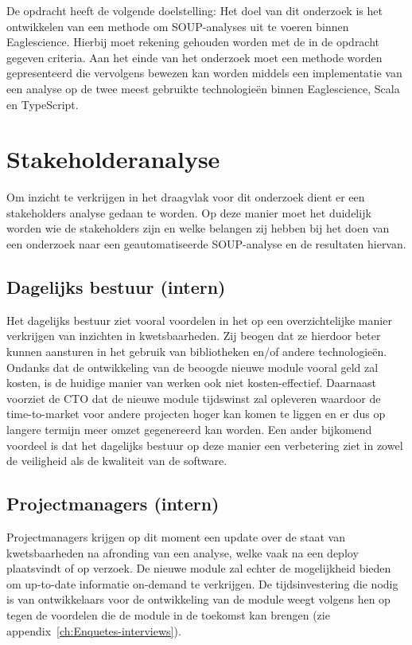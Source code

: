 De opdracht heeft de volgende doelstelling:
Het doel van dit onderzoek is het ontwikkelen van een methode om SOUP-analyses uit te voeren binnen Eaglescience. Hierbij moet rekening gehouden worden met de in de opdracht gegeven criteria. Aan het einde van het onderzoek moet een methode worden gepresenteerd die vervolgens bewezen kan worden middels een implementatie van een analyse op de twee meest gebruikte technologieën binnen Eaglescience, Scala en TypeScript.


\section{Stakeholderanalyse}\label{sec:stakeholdersanalyse}
Om inzicht te verkrijgen in het draagvlak voor dit onderzoek dient er een stakeholders analyse gedaan te worden. Op deze manier moet het duidelijk worden wie de stakeholders zijn en welke belangen zij hebben bij het doen van een onderzoek naar een geautomatiseerde SOUP-analyse en de resultaten hiervan.

\subsection{Dagelijks bestuur (intern)}\label{subsec:dagelijks-bestuur-(intern)}
Het dagelijks bestuur ziet vooral voordelen in het op een overzichtelijke manier verkrijgen van inzichten in kwetsbaarheden. Zij beogen dat ze hierdoor beter kunnen aansturen in het gebruik van bibliotheken en/of andere technologieën. Ondanks dat de ontwikkeling van de beoogde nieuwe module vooral geld zal kosten, is de huidige manier van werken ook niet kosten-effectief. Daarnaast voorziet de CTO dat de nieuwe module tijdswinst zal opleveren waardoor de time-to-market voor andere projecten hoger kan komen te liggen en er dus op langere termijn meer omzet gegenereerd kan worden. Een ander bijkomend voordeel is dat het dagelijks bestuur op deze manier een verbetering ziet in zowel de veiligheid als de kwaliteit van de software.

\subsection{Projectmanagers (intern)}\label{subsec:projectmanagers-(intern)}
Projectmanagers krijgen op dit moment een update over de staat van kwetsbaarheden na afronding van een analyse, welke vaak na een deploy plaatsvindt of op verzoek. De nieuwe module zal echter de mogelijkheid bieden om up-to-date informatie on-demand te verkrijgen.
De tijdsinvestering die nodig is van ontwikkelaars voor de ontwikkeling van de module weegt volgens hen op tegen de voordelen die de module in de toekomst kan brengen (zie appendix~\ref{ch:Enquetes-interviews}).

